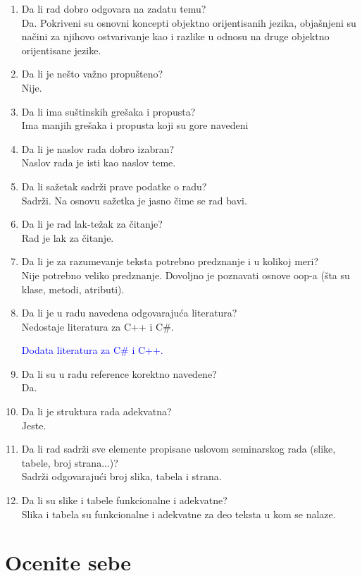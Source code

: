 \documentclass[a4paper]{report}
\newcommand{\odgovor}[1]{\textcolor{blue}{#1}}
\begin{document}
\begin{enumerate}
\item Da li rad dobro odgovara na zadatu temu?\\
Da. Pokriveni su osnovni koncepti objektno orijentisanih jezika, obja\v snjeni su na\v cini za njihovo ostvarivanje kao i razlike u odnosu na druge objektno orijentisane jezike.
\item Da li je nešto važno propušteno?\\
Nije.
\item Da li ima suštinskih grešaka i propusta?\\
Ima manjih gre\v saka i propusta koji su gore navedeni
\item Da li je naslov rada dobro izabran?\\
Naslov rada je isti kao naslov teme.
\item Da li sažetak sadrži prave podatke o radu?\\
Sadr\v zi. Na osnovu sa\v zetka je jasno \v cime se rad bavi.
\item Da li je rad lak-težak za čitanje?\\
Rad je lak za \v citanje.
\item Da li je za razumevanje teksta potrebno predznanje i u kolikoj meri?\\
Nije potrebno veliko predznanje. Dovoljno je poznavati osnove oop-a (\v sta su klase, metodi, atributi).
\item Da li je u radu navedena odgovarajuća literatura?\\
Nedostaje literatura za C++ i C\#.

\odgovor{
Dodata literatura za C\# i C++.
}

\item Da li su u radu reference korektno navedene?\\
Da.
\item Da li je struktura rada adekvatna?\\
Jeste.
\item Da li rad sadrži sve elemente propisane uslovom seminarskog rada (slike, tabele, broj strana...)?\\
Sadr\v zi odgovaraju\'ci broj slika, tabela i strana.
\item Da li su slike i tabele funkcionalne i adekvatne?\\
Slika i tabela su funkcionalne i adekvatne za deo teksta u kom se nalaze.
\end{enumerate}

\section{Ocenite sebe}
\end{document}
